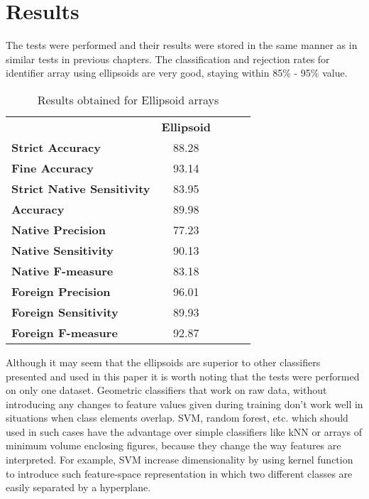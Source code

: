 \section{Results}

The tests were performed and their results were stored in the same manner as in similar tests in previous chapters. The classification and rejection rates for identifier array using ellipsoids are very good, staying within 85\% - 95\% value.

\begin{table}[htp]
	\centering
	\caption{Results obtained for Ellipsoid arrays}
	\label{ellipsoid_arrays_results}
	\begin{tabular}{l|c|lll}
		\cline{2-2}
		& \multicolumn{1}{l|}{\textbf{Ellipsoid}} &  &  &  \\ \cline{1-2}
		\multicolumn{1}{|l|}{\textbf{Strict Accuracy}}           & 88.28 \\ \cline{1-2}
		\multicolumn{1}{|l|}{\textbf{Fine Accuracy}}             & 93.14 \\ \cline{1-2}
		\multicolumn{1}{|l|}{\textbf{Strict Native Sensitivity}} & 83.95 \\ \cline{1-2}
		\multicolumn{1}{|l|}{\textbf{Accuracy}}                  & 89.98 \\ \cline{1-2}
		\multicolumn{1}{|l|}{\textbf{Native Precision}}          & 77.23 \\ \cline{1-2}
		\multicolumn{1}{|l|}{\textbf{Native Sensitivity}}        & 90.13 \\ \cline{1-2}
		\multicolumn{1}{|l|}{\textbf{Native F-measure}}          & 83.18 \\ \cline{1-2}
		\multicolumn{1}{|l|}{\textbf{Foreign Precision}}         & 96.01 \\ \cline{1-2}
		\multicolumn{1}{|l|}{\textbf{Foreign Sensitivity}}       & 89.93 \\ \cline{1-2}
		\multicolumn{1}{|l|}{\textbf{Foreign F-measure}}         & 92.87 \\ \cline{1-2}
	\end{tabular}
\end{table}

Although it may seem that the ellipsoids are superior to other classifiers presented and used in this paper it is worth noting that the tests were performed on only one dataset. Geometric classifiers that work on raw data, without introducing any changes to feature values given during training don't work well in situations when class elements overlap. SVM, random forest, etc. which should used in such cases have the advantage over simple classifiers like kNN or arrays of minimum volume enclosing figures, because they change the way features are interpreted. For example, SVM increase dimensionality by using kernel function to introduce such feature-space representation in which two different classes are easily separated by a hyperplane.
